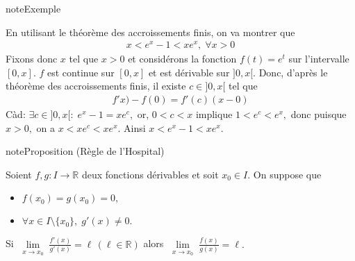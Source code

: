 \documentclass[letterpaper,10pt,french]{jupyterBook}
\begin{document}
\begin{sphinxadmonition}{note}{Exemple}

\sphinxAtStartPar
En utilisant le théorème des accroissements finis, on va montrer que
\begin{equation*}
\begin{split}
x<e^x -1<xe^x,\;\forall x>0
\end{split}
\end{equation*}
\sphinxAtStartPar
Fixons donc \(x\) tel que \(x>0\) et considérons la fonction \(f(t)=e^t\) sur l’intervalle \([0,x].\) \(f\) est continue sur \([0,x]\) et est dérivable sur \(]0,x[.\) Donc, d’après le théorème des accroissements finis, il existe \(c\in ]0,x[\) tel que
\begin{equation*}
\begin{split}
f'x)-f(0)=f'(c)(x-0)
\end{split}
\end{equation*}
\sphinxAtStartPar
C\sphinxhyphen{}à\sphinxhyphen{}d: \(\exists c\in ]0,x[:\;e^x-1=xe^c,\) or, \(0<c<x\) implique \(1<e^c<e^x,\) donc puisque \(x>0,\) on a \(x<xe^c<xe^x.\) Ainsi \(x<e^x-1<xe^x.\)
\end{sphinxadmonition}

\begin{sphinxadmonition}{note}{Proposition (Règle de l’Hospital)}

\sphinxAtStartPar
Soient \(f,g:I\rightarrow \mathbb{R}\) deux fonctions dérivables et soit \(x_0\in I.\) On suppose que
\begin{itemize}
\item {} 
\sphinxAtStartPar
\(f(x_0)=g(x_0)=0,\)

\item {} 
\sphinxAtStartPar
\(\forall x\in I\setminus\{x_0\},\;g'(x)\neq0.\)

\end{itemize}

\sphinxAtStartPar
Si \(\lim\limits_{\substack{x\rightarrow x_0}}\frac{f'(x)}{g'(x)}=\ell \,(\ell\in \mathbb{R})\) alors \(\lim\limits_{\substack{x\rightarrow x_0}}\frac{f(x)}{g(x)}=\ell.\)
\end{sphinxadmonition}
\end{document}

